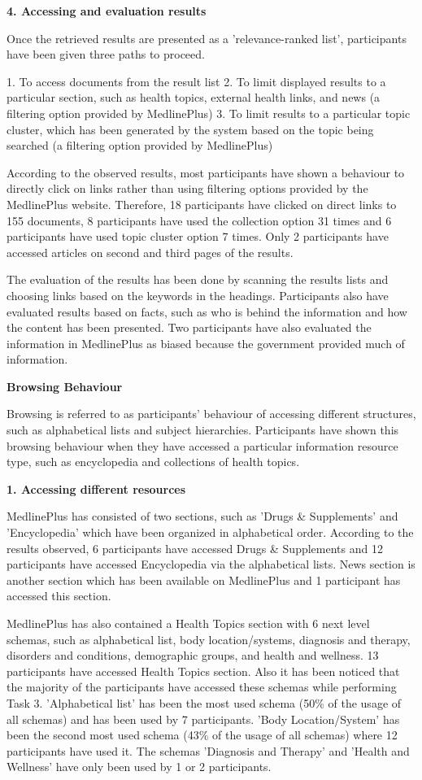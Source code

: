 \documentclass[]{article}
\begin{document}
\textbf{4. Accessing and evaluation results}

Once the retrieved results are presented as a 'relevance-ranked list', participants have been given three paths to proceed.

1. To access documents from the result list
2. To limit displayed results to a particular section, such as health topics, external health links, and news (a filtering option provided by MedlinePlus)
3. To limit results to a particular topic cluster, which has been generated by the system based on the topic being searched (a filtering option provided by MedlinePlus)

According to the observed results, most participants have shown a behaviour to directly click on links rather than using filtering options provided by the MedlinePlus website. Therefore, 18 participants have clicked on direct links to 155 documents, 8 participants have used the collection option 31 times and 6 participants have used topic cluster option 7 times. Only 2 participants have accessed articles on second and third pages of the results.       

The evaluation of the results has been done by scanning the results lists and choosing links based on the keywords in the headings. Participants also have evaluated results based on facts, such as who is behind the information and how the content has been presented. Two participants have also evaluated the information in MedlinePlus as biased because the government provided much of information.  

\textbf{Browsing Behaviour}

Browsing is referred to as participants' behaviour of accessing different structures, such as alphabetical lists and subject hierarchies. Participants have shown this browsing behaviour when they have accessed a particular information resource type, such as encyclopedia and collections of health topics. 

\textbf{1. Accessing different resources}

MedlinePlus has consisted of two sections, such as 'Drugs \& Supplements' and 'Encyclopedia' which have been organized in alphabetical order. According to the results observed, 6 participants have accessed Drugs \& Supplements and 12 participants have accessed Encyclopedia via  the alphabetical lists. News section is another section which has been available on MedlinePlus and 1 participant has accessed this section. 

MedlinePlus has also contained a Health Topics section with 6 next level schemas, such as alphabetical list, body location/systems, diagnosis and therapy, disorders and conditions, demographic groups, and health and wellness. 13 participants have accessed Health Topics section. Also it has been noticed that the majority of the participants have accessed these schemas while performing Task 3. 'Alphabetical list' has been the most used schema (50\% of the usage of all schemas) and has been used by 7 participants. 'Body Location/System' has been the second most used schema (43\% of the usage of all schemas) where 12 participants have used it. The schemas 'Diagnosis and
Therapy' and 'Health and Wellness' have only been used by 1 or 2 participants.                 
 
\end{document}
